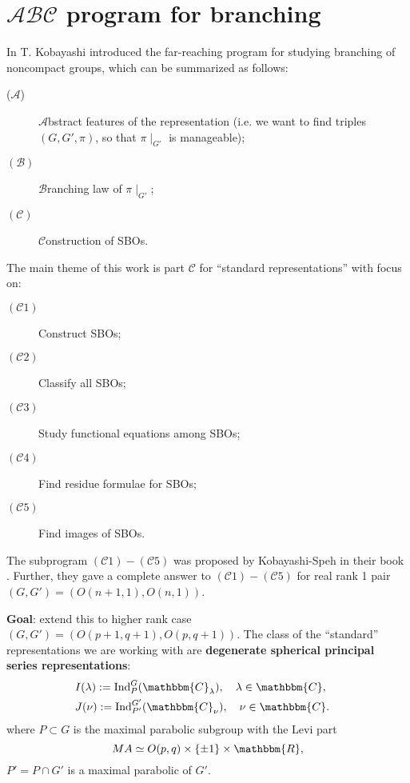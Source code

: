 \documentclass[12pt]{article} %
\newcommand{\assign}{:=}
\newcommand{\tmop}[1]{\ensuremath{\operatorname{#1}}}
\theoremstyle{definition}
\theoremstyle{exampstyle} \newtheorem{examp}[theorem]{Theorem}
\newcommand{\tmtextbf}[1]{{\bfseries{#1}}}
\begin{document}
\section{$\mathcal{A}\mathcal{B}\mathcal{C}$ program for branching}

In {\cite{kobayashi2015program}} T. Kobayashi introduced the far-reaching
program for studying branching of noncompact groups, which can be summarized
as follows:
\begin{description}
  \item[($\mathcal{A}$)] $\mathcal{A}$bstract features of the representation
  (i.e. we want to find triples $(G, G', \pi)$, so that $\pi \mid_{G'}$ is
  manageable);
  
  \item[$(\mathcal{B})$] $\mathcal{B}$ranching law of $\pi \mid_{G'}$;
  
  \item[$(\mathcal{C})$] $\mathcal{C}$onstruction of SBOs.
\end{description}
The main theme of this work is part $\mathcal{C}$ for ``standard
representations'' with focus on:
\begin{description}
  \item[$(\mathcal{C}1)$] Construct SBOs;
  
  \item[$(\mathcal{C}2)$] Classify all SBOs;
  
  \item[$(\mathcal{C}3)$] Study functional equations among SBOs;
  
  \item[$(\mathcal{C}4)$] Find residue formulae for SBOs;
  
  \item[$(\mathcal{C}5)$] Find images of SBOs.
\end{description}
The subprogram $(\mathcal{C}1) - (\mathcal{C}5)$ was proposed by
Kobayashi-Speh in their book {\cite{kobayashi2015symmetry}}. Further, they
gave a complete answer to $(\mathcal{C}1) - (\mathcal{C}5)$ for real rank 1
pair $(G, G') = (O (n + 1, 1), O (n, 1))$.

\tmtextbf{Goal}: extend this to higher rank case $(G, G') = (O (p + 1, q + 1),
O (p, q + 1))$. The class of the ``standard'' representations we are working
with are \tmtextbf{degenerate spherical principal series representations}:
\begin{eqnarray}
  & I (\lambda) \assign \tmop{Ind}_P^G (\mathbbm{C}_{\lambda}), \quad \lambda
  \in \mathbbm{C}, &  \nonumber\\
  & J (\nu) \assign \tmop{Ind}_{P'}^{G'} (\mathbbm{C}_{\nu}), \quad \nu \in
  \mathbbm{C}. &  \nonumber
\end{eqnarray}
where $P \subset G$ is the maximal parabolic subgroup with the Levi part
\[ M A \simeq O (p, q) \times \{ \pm 1 \} \times \mathbbm{R}, \]
$P' = P \cap G'$ is a maximal parabolic of $G'$.
\end{document}
